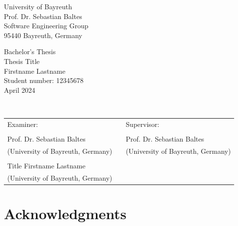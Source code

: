 \documentclass[
	pdftex,
	12pt,
	a4paper,
	parskip=relative,
	twoside,
	footinclude=false,
	footheight=0mm,
	toc=bibliography,
	toc=listof
]{scrbook}
\theoremstyle{definitiontight}
\newcommand{\thesistype}{Bachelor's Thesis} %
\newcommand{\thesistitle}{Thesis Title}
\newcommand{\studentname}{Firstname Lastname}
\newcommand{\monthyear}{April 2024}
\newcommand{\studentnumber}{12345678}
\newcommand{\examiner}{Prof. Dr. Sebastian Baltes}
\newcommand{\secondexaminer}{Title Firstname Lastname}
\newcommand{\supervisor}{Prof. Dr. Sebastian Baltes} %
\begin{document}
{
\thispagestyle{empty}
	
\begin{center}
	{\large University of Bayreuth}\\
	\vspace{5pt}
	Prof. Dr. Sebastian Baltes\\
	Software Engineering Group\\
	95440 Bayreuth, Germany\\
\end{center}
	
\vspace{1pt}
	
\begin{center}
	\thesistype \\
	\vspace{11pt}
	{\Large\textsf{\thesistitle}}\\
	\vspace{15pt}
	\studentname \\
	{\scriptsize Student number: \studentnumber}\\
	\vspace{15pt}
	\monthyear \\
\end{center}

\vspace{10pt}
	
\begin{center}
	{\large{}}\\
\end{center}
\noindent \lipsum[1-2]

\vfill
	
\noindent
\begin{tabularx}{\textwidth}{l X l}
   Examiner:     & & Supervisor: \\
   \\
   \examiner         & & \supervisor \\
   {\scriptsize (University of Bayreuth, Germany)} & & {\scriptsize (University of Bayreuth, Germany)} \\
   \\
   \secondexaminer && \\
   {\scriptsize (University of Bayreuth, Germany)} & & 
\end{tabularx}

\newpage

\chapter*{Acknowledgments}

}
\end{document}
